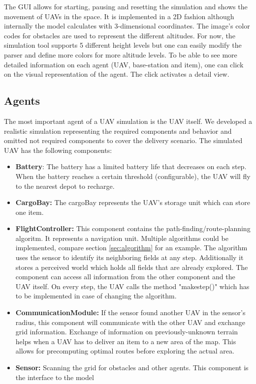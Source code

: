 The GUI allows for starting, pausing and resetting the simulation and shows the movement of UAVs in the space. It is implemented in a 2D fashion although internally the model calculates with 3-dimensional coordinates. The image's color codes for obstacles are used to represent the different altitudes. For now, the simulation tool supports 5 different height levels but one can easily modify the parser and define more colors for more altitude levels.
To be able to see more detailed information on each agent (UAV, base-station and item), one can click on the visual representation of the agent. The click activates a detail view. 



\subsection{Agents}\label{sec:UAV}
The most important agent of a UAV simulation is the UAV itself. We developed a realistic simulation representing the required components and behavior and omitted not required components to cover the delivery scenario. The simulated UAV has the following components:
	\begin{itemize}
			\item \textbf{Battery}: The battery has a limited battery life that decreases on each step. When the battery reaches a certain threshold (configurable), the UAV will fly to the nearest depot to recharge.
					\item \textbf{CargoBay:} The cargoBay represents the UAV's storage unit which can store one item.
		\item \textbf{FlightController:} This component contains the path-finding/route-planning algoritm. It represents a navigation unit. Multiple algorithms could be implemented, compare section \ref{sec:algorithm} for an example. The algorithm uses the sensor to identify its neighboring fields at any step. Additionally it stores a perceived world which holds all fields that are already explored. The component can access all information from the other component and the UAV itself. On every step, the UAV calls the method "make\textunderscore step()" which has to be implemented in case of changing the algorithm.
		\item \textbf{CommunicationModule:} If the sensor found another UAV in the sensor's radius, this component will communicate with the other UAV and exchange grid information. Exchange of information on previously-unknown terrain helps when a UAV has to deliver an item to a new area of the map. This allows for precomputing optimal routes before exploring the actual area.
		\item \textbf{Sensor:} Scanning the grid for obstacles and other agents. This component is the interface to the model
	\end{itemize}

